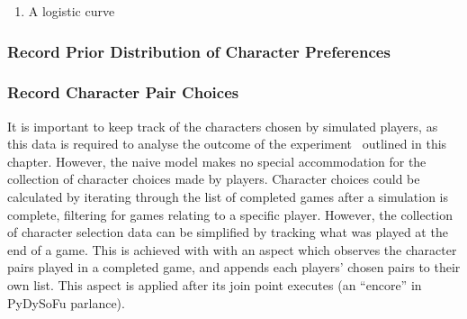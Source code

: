 \begin{enumerate}
  \item A logistic curve
\end{enumerate}



\subsubsection{Record Prior Distribution of Character Preferences}



\subsubsection{Record Character Pair Choices}
It is important to keep track of the characters chosen by simulated players, as this data is
required to analyse the outcome of the experiment~ outlined in this chapter. However, the naive model makes
no special accommodation for the collection of character choices made by players. Character choices could
be calculated by iterating through the list of completed games after a simulation is complete, filtering
for games relating to a specific player. However, the collection of character selection data can be simplified
by tracking what was played at the end of a game.
This is achieved with with an
aspect which observes the character pairs played in a completed game, and appends each players' chosen pairs to their own list.
This aspect is applied after
its join point executes (an ``encore'' in PyDySoFu parlance).


